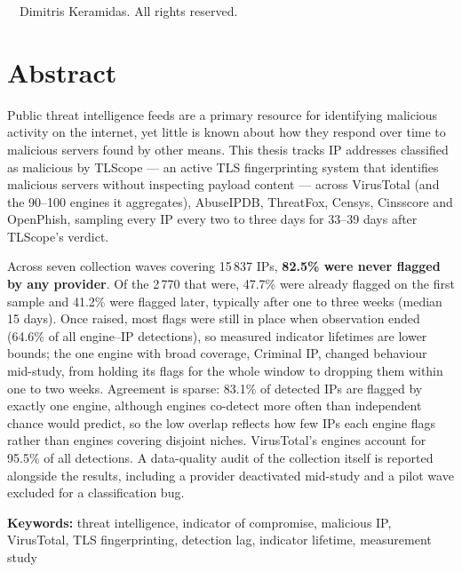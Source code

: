 \cleardoublepage

\thispagestyle{empty}
\vspace*{\fill}
\begin{center}
  \textcopyright\ \the\year\ Dimitris Keramidas. All rights reserved.
\end{center}
\vspace*{\fill}
\cleardoublepage

\chapter*{Abstract}

Public threat intelligence feeds are a primary resource for identifying malicious activity on the
internet, yet little is known about how they respond over time to malicious servers found by other
means. This thesis tracks IP addresses classified as malicious by TLScope --- an active TLS
fingerprinting system that identifies malicious servers without inspecting payload content ---
across VirusTotal (and the 90--100 engines it aggregates), AbuseIPDB, ThreatFox, Censys, Cinsscore and
OpenPhish, sampling every IP every two to three days for 33--39 days after TLScope's verdict.

Across seven collection waves covering 15\,837 IPs, \textbf{82.5\% were never flagged by any
provider}. Of the 2\,770 that were, 47.7\% were already flagged on the first sample and 41.2\% were
flagged later, typically after one to three weeks (median 15 days). Once raised, most flags were
still in place when observation ended (64.6\% of all engine--IP detections), so measured indicator
lifetimes are lower bounds; the one engine with broad coverage, Criminal IP, changed behaviour
mid-study, from holding its flags for the whole window to dropping them within one to two weeks.
Agreement is sparse: 83.1\% of detected IPs are flagged by exactly one engine, although engines
co-detect more often than independent chance would predict, so the low overlap reflects how few IPs
each engine flags rather than engines covering disjoint niches. VirusTotal's engines account for
95.5\% of all detections. A data-quality audit of the collection itself is reported alongside the
results, including a provider deactivated mid-study and a pilot wave excluded for a classification
bug.

\bigskip\noindent
\textbf{Keywords:} threat intelligence, indicator of compromise, malicious IP, VirusTotal,
TLS fingerprinting, detection lag, indicator lifetime, measurement study

